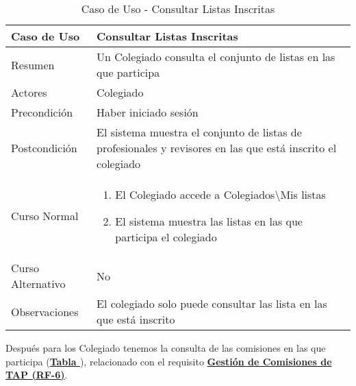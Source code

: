 \begin{table}[!htbp]
  \centering  \addtocounter{casouso}{1}
  \begin{tabular}{|l | p{100mm}|}
    \textbf{Caso de Uso}  & \textbf{Consultar Listas Inscritas} \\ \hline
    Resumen 		 & Un Colegiado consulta el conjunto de listas en las que participa \\ \hline
    Actores  		 & Colegiado \\ \hline
    Precondición  	 & Haber iniciado sesión \\ \hline
    Postcondición  	 & El sistema muestra el conjunto de listas de profesionales y revisores en las que está inscrito el colegiado \\ \hline
    Curso Normal   	 & \begin{enumerate}
	  \item El Colegiado accede a Colegiados\textbackslash Mis listas
	  \item El sistema muestra las listas en las que participa el colegiado
    \end{enumerate}  \\ \hline
    Curso Alternativo  & No  \\ \hline
    Observaciones 	 & El colegiado solo puede consultar las lista en las que está inscrito \\ \hline
  \end{tabular}
  \caption{Caso de Uso  - Consultar Listas Inscritas}
  \label{tab:cucConsultaLista}
\end{table}
\FloatBarrier

\addtocounter{tabla}{1}
Después para los Colegiado tenemos la consulta de las comisiones en las que participa (\textbf{\hyperref[tab:cucConsultaComision]{Tabla }}), relacionado con el requisito \textbf{\hyperref[tab:rfGestComTAP]{Gestión de Comisiones de TAP (RF-6)}}.


